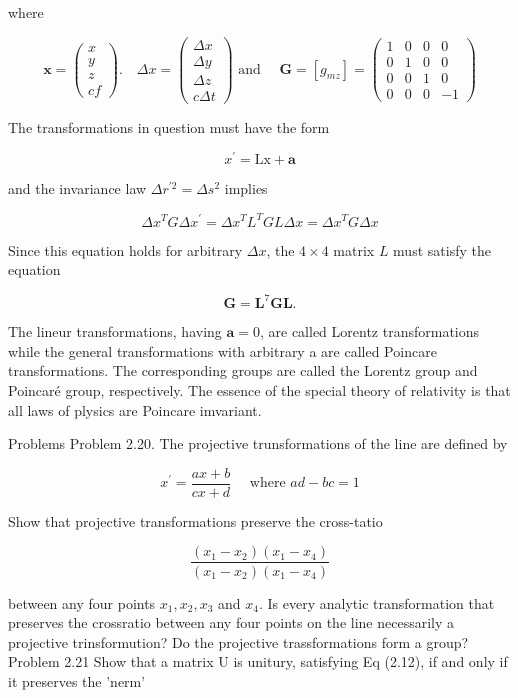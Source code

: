 where

$$
\mathbf{x}=\left(\begin{array}{c}
x \\
y \\
z \\
c f
\end{array}\right) . \quad \Delta x=\left(\begin{array}{c}
\Delta x \\
\Delta y \\
\Delta z \\
c \Delta t
\end{array}\right) \text { and } \quad \mathbf{G}=\left[g_{m z}\right]=\left(\begin{array}{cccc}
1 & 0 & 0 & 0 \\
0 & 1 & 0 & 0 \\
0 & 0 & 1 & 0 \\
0 & 0 & 0 & -1
\end{array}\right)
$$


The transformations in question must have the form

$$
x^{\prime}=\mathrm{Lx}+\mathbf{a}
$$

and the invariance law $\Delta r^{\prime 2}=\Delta s^2$ implies

$$
\Delta x^T G \Delta x^{\prime}=\Delta x^T L^T G L \Delta x=\Delta x^T G \Delta x
$$


Since this equation holds for arbitrary $\Delta x$, the $4 \times 4$ matrix $L$ must satisfy the equation

$$
\mathbf{G}=\mathbf{L}^7 \mathbf{G L} .
$$


The lineur transformations, having $\mathbf{a}=0$, are called Lorentz transformations while the general transformations with arbitrary a are called Poincare transformations. The corresponding groups are called the Lorentz group and Poincaré group, respectively. The essence of the special theory of relativity is that all laws of plysics are Poincare imvariant.

Problems
Problem 2.20. The projective trunsformations of the line are defined by

$$
x^{\prime}=\frac{a x+b}{c x+d} \quad \text { where } a d-b c=1
$$


Show that projective transformations preserve the cross-tatio

$$
\frac{\left(x_1-x_2\right)\left(x_1-x_4\right)}{\left(x_1-x_2\right)\left(x_1-x_4\right)}
$$

between any four points $x_1, x_2, x_3$ and $x_4$. Is every analytic transformation that preserves the crossratio between any four points on the line necessarily a projective trinsformution? Do the projective trassformations form a group?
Problem 2.21 Show that a matrix U is unitury, satisfying Eq (2.12), if and only if it preserves the 'nerm'


